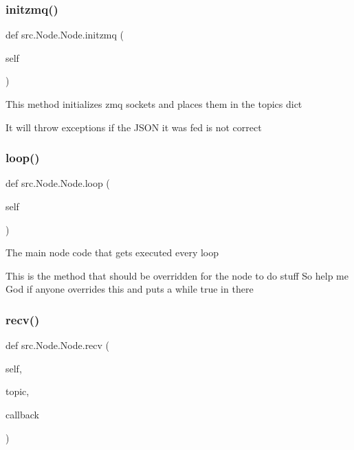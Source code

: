 \subsubsection{\texorpdfstring{initzmq()}{initzmq()}}
{\footnotesize\ttfamily def src.\+Node.\+Node.\+initzmq (\begin{DoxyParamCaption}\item[{}]{self }\end{DoxyParamCaption})}

\begin{DoxyVerb}This method initializes zmq sockets and places them in the topics dict

It will throw exceptions if the JSON it was fed is not correct
\end{DoxyVerb}
 \mbox{\label{classsrc_1_1_node_1_1_node_a0c82a88ce23ea5b4a117fb91f72a14dd}} 
\subsubsection{\texorpdfstring{loop()}{loop()}}
{\footnotesize\ttfamily def src.\+Node.\+Node.\+loop (\begin{DoxyParamCaption}\item[{}]{self }\end{DoxyParamCaption})}

\begin{DoxyVerb}The main node code that gets executed every loop

This is the method that should be overridden for the node to do stuff
So help me God if anyone overrides this and puts a while true in there
\end{DoxyVerb}
 \mbox{\label{classsrc_1_1_node_1_1_node_a3ca4283da7b7b918412cfffd3833e26d}} 
\subsubsection{\texorpdfstring{recv()}{recv()}}
{\footnotesize\ttfamily def src.\+Node.\+Node.\+recv (\begin{DoxyParamCaption}\item[{}]{self,  }\item[{}]{topic,  }\item[{}]{callback }\end{DoxyParamCaption})}

